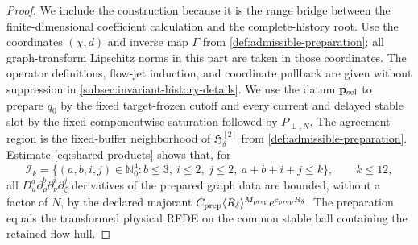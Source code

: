 \begin{proof}
We include the construction because it is the range bridge between the
finite-dimensional coefficient calculation and the complete-history root.
Use the coordinates \((\chi,d)\) and inverse map \(\Gamma\) from
\cref{def:admissible-preparation}; all graph-transform Lipschitz norms in
this part are taken in those coordinates.  The operator definitions,
flow-jet induction, and coordinate pullback are given without suppression in
\cref{subsec:invariant-history-details}.  We use the datum \(\mathbf p_{\rm sel}\)
to prepare \(q_0\) by the fixed
target-frozen cutoff and every current and delayed stable slot by the fixed
componentwise saturation followed by \(P_{\perp,N}\).  The agreement region
is the fixed-buffer neighborhood of \(\mathfrak H^{[2]}_\delta\) from
\cref{def:admissible-preparation}.  Estimate \cref{eq:shared-products} shows
that, for
\[
 \mathcal I_k=\{(a,b,i,j)\in\mathbb N_0^4:
 b\le3,\ i\le2,\ j\le2,\ a+b+i+j\le k\},
 \qquad k\le12,
\]
all \(D_u^a\partial_\rho^b\partial_\nu^i\partial_\zeta^j\) derivatives of
the prepared graph data are bounded, without a factor of \(N\), by the
declared majorant
\(C_{\rm prep}\langle R_\delta\rangle^{M_{\rm prep}}
e^{c_{\rm prep}R_\delta}\).  The preparation equals the transformed
physical RFDE on the common stable ball containing the retained flow hull.


\end{proof}

